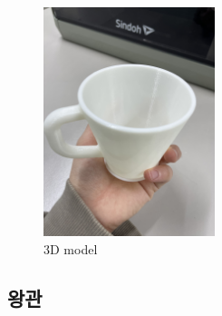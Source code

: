 \documentclass[a4paper, 10pt, nanum]{CSUniSchoolLabReport}
\begin{document}
\begin{enumerate}[label=\arabic*.]
\begin{figure}[htb!]
\begin{minipage}{.5\textwidth}
			\label{fig:5}
		\end{minipage}
	\end{figure}
	\begin{figure}[htb!]
		\centering
		\includegraphics[width=5cm]{fig6.jpg}
		\caption{3D model}
		\label{fig:6}
	\end{figure}
\end{enumerate}

\subsection{왕관}
\end{document}
